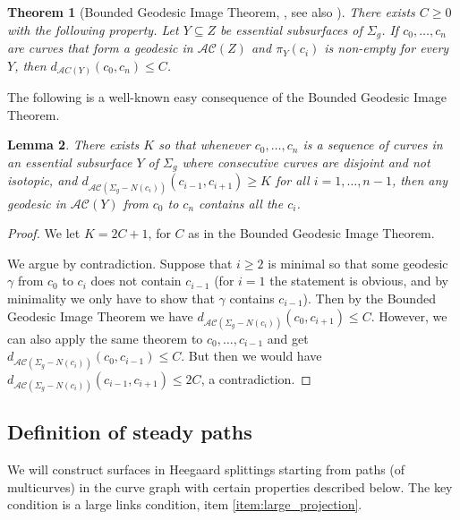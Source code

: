 \documentclass[11pt, oneside]{amsart}
\newtheorem{lemma}{Lemma}[section]
\newtheorem{thm}[lemma]{Theorem}
\theoremstyle{definition}
\theoremstyle{definition}
\begin{document}
\begin{thm}[Bounded Geodesic Image Theorem, \cite{MasurMinsky:II}, see also \cite{Webb:BGI}]
There exists $C\geq 0$ with the following property. Let $Y\subseteq Z$ be essential subsurfaces of $\Sigma_g$. If $c_0,\dots,c_n$ are curves that form a geodesic in $\mathcal{AC}(Z)$ and $\pi_Y(c_i)$ is non-empty for every $Y$, then $d_{\mathcal AC(Y)}(c_0,c_n)\leq C$. 
\end{thm}


The following is a well-known easy consequence of the Bounded Geodesic Image Theorem.

\begin{lemma}\label{lem:concat_large_angle}
 There exists $K$ so that whenever $c_0,\dots,c_n$ is a sequence of curves in an essential subsurface $Y$ of $\Sigma_g$ where consecutive curves are disjoint and not isotopic, and $d_{\mathcal{AC}(\Sigma_g-N(c_i))}(c_{i-1},c_{i+1})\geq K$ for all $i=1,\dots, n-1$, then any geodesic in $\mathcal{AC}(Y)$ from $c_0$ to $c_n$ contains all the $c_i$.
\end{lemma}

\begin{proof}
We let $K=2C+1$, for $C$ as in the Bounded Geodesic Image Theorem.

 We argue by contradiction. Suppose that $i\geq 2$ is minimal so that some geodesic $\gamma$ from $c_0$ to $c_i$ does not contain $c_{i-1}$ (for $i=1$ the statement is obvious, and by minimality we only have to show that $\gamma$ contains $c_{i-1}$). Then by the Bounded Geodesic Image Theorem we have $d_{\mathcal{AC}(\Sigma_g-N(c_i))}(c_{0},c_{i+1})\leq C$. However, we can also apply the same theorem to $c_0,\dots,c_{i-1}$ and get $d_{\mathcal{AC}(\Sigma_g-N(c_i))}(c_{0},c_{i-1})\leq C$. But then we would have $d_{\mathcal{AC}(\Sigma_g-N(c_i))}(c_{i-1},c_{i+1})\leq 2C$, a contradiction. 
\end{proof}


\subsection{Definition of steady paths}

We will construct surfaces in Heegaard splittings starting from paths (of multicurves) in the curve graph with certain properties described below. The key condition is a large links condition, item \ref{item:large_projection}.
\end{document}
